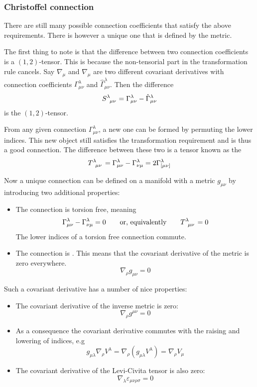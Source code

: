 \subsubsection{Christoffel connection}
There are still many possible connection coefficients that satisfy the above requirements. There is however a unique one that is defined by the metric.

The first thing to note is that the difference between two connection coefficients is a $(1,2)$-tensor. This is because the non-tensorial part in the transformation rule cancels. Say $\nabla_\mu$ and $\hat{\nabla}_\mu$ are two different covariant derivatives with connection coefficients $\Gamma^\lambda_{\mu\nu}$ and $\hat{\Gamma}^\lambda_{\mu\nu}$. Then the difference
\[ \tensor{S}{^\lambda_\mu_\nu} = \Gamma^\lambda_{\mu\nu} - \hat{\Gamma}^\lambda_{\mu\nu}\]
is the $(1,2)$-tensor.

From any given connection $\Gamma^\lambda_{\mu\nu}$, a new one can be formed by permuting the lower indices. This new object still satisfies the transformation requirement and is thus a good connection. The difference between these two is a tensor known as the 
\[ \tensor{T}{^\lambda_\mu_\nu} = \Gamma^\lambda_{\mu\nu} - \Gamma^\lambda_{\nu\mu} = 2\Gamma^\lambda_{[\mu\nu]} \]

Now a unique connection can be defined on a manifold with a metric $g_{\mu\nu}$ by introducing two additional properties:

\begin{itemize}
\item The connection is torsion free, meaning
\[ \Gamma^\lambda_{\mu\nu} - \Gamma^\lambda_{\nu\mu} = 0 \qquad \text{or, equivalently} \qquad \tensor{T}{^\lambda_\mu_\nu} = 0 \]
The lower indices of a torsion free connection commute.
\item The connection is . This means that the covariant derivative of the metric is zero everywhere.
\[ \nabla_\rho g_{\mu\nu} = 0 \]
\end{itemize}
Such a covariant derivative has a number of nice properties:
\begin{eigenschap}
\begin{itemize}
\item The covariant derivative of the inverse metric is zero:
\[ \nabla_\rho g^{\mu\nu} = 0 \]
\item As a consequence the covariant derivative commutes with the raising and lowering of indices, e.g\
\[ g_{\mu\lambda}\nabla_\rho V^\lambda = \nabla_\rho (g_{\mu\lambda}V^\lambda) = \nabla_\rho V_\mu \]
\item The covariant derivative of the Levi-Civita tensor is also zero:
\[ \nabla_\lambda \varepsilon_{\mu\nu\rho\sigma} = 0 \]
\end{itemize}
\end{eigenschap}

